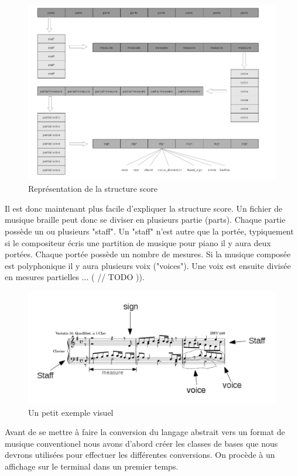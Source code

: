 \begin{figure}[!h]
  \includegraphics[scale=0.8]{images/bmc-score.png}
  \caption{Représentation de la structure score}
\end{figure}

Il est donc maintenant plus facile d'expliquer la structure score. Un fichier de musique braille peut donc se diviser en plusieurs partie (parts). Chaque partie possède un ou plusieurs "staff". Un "staff" n'est autre que la portée, typiquement si le compositeur écris une partition de musique pour piano il y aura deux portées. Chaque portée possède un nombre de mesures. Si la musique composée est polyphonique il y aura plusieurs voix ("voices"). Une voix est ensuite divisée en mesures partielles ... ( // TODO )).


\begin{figure}[!h]
  \includegraphics[scale=0.4]{images/score-visu.png}
  \caption{Un petit exemple visuel}
\end{figure}

Avant de se mettre à faire la conversion du langage abstrait vers un format de musique conventionel nous avons d'abord créer les classes de bases que nous devrons utilisées pour effectuer les différentes conversions. On procède à un affichage sur le terminal dans un premier temps.

